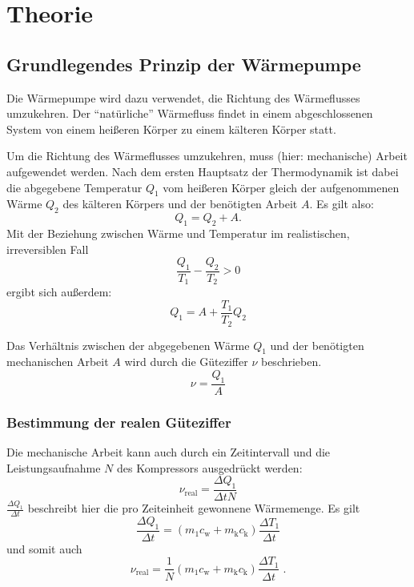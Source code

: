 \section{Theorie} \label{sec:Theorie}

\subsection{Grundlegendes Prinzip der Wärmepumpe}

    Die Wärmepumpe wird dazu verwendet, die Richtung des Wärmeflusses umzukehren.
    Der \enquote{natürliche} Wärmefluss findet in einem abgeschlossenen System von einem heißeren Körper
    zu einem kälteren Körper statt.

    Um die Richtung des Wärmeflusses umzukehren, muss (hier: mechanische) Arbeit aufgewendet werden.
    Nach dem ersten Hauptsatz der Thermodynamik ist dabei die abgegebene Temperatur $Q_1$ vom heißeren Körper
    gleich der aufgenommenen Wärme $Q_2$ des kälteren Körpers und der benötigten Arbeit $A$.
    Es gilt also:
    \begin{equation}
        Q_1 = Q_2 + A .
    \end{equation}
    Mit der Beziehung zwischen Wärme und Temperatur im realistischen, irreversiblen Fall
    \begin{equation}
        \frac{Q_1}{T_1} - \frac{Q_2}{T_2} > 0
    \end{equation}
    ergibt sich außerdem:
    \begin{equation}
        Q_1 = A + \frac{T_1}{T_2} Q_2
    \end{equation}

    Das Verhältnis zwischen der abgegebenen Wärme $Q_1$ und der benötigten mechanischen Arbeit $A$ wird durch die Güteziffer $\nu$
    beschrieben.
    \begin{equation}
        \nu = \frac{Q_1}{A}
    \end{equation}

\subsubsection{Bestimmung der realen Güteziffer}

    Die mechanische Arbeit kann auch durch ein Zeitintervall und die Leistungsaufnahme $N$ des Kompressors ausgedrückt werden:
    \begin{equation}
        \nu_\text{real} = \frac{\Delta Q_1}{\Delta t N}
    \end{equation}
    $\frac{\Delta Q_1}{\Delta t}$ beschreibt hier die pro Zeiteinheit gewonnene Wärmemenge. Es gilt
    \begin{equation}
        \frac{\Delta Q_1}{\Delta t} = (m_1 c_\text{w} + m_\text{k} c_\text{k}) \frac{\Delta T_1}{\Delta t}
    \end{equation}
    und somit auch
    \begin{equation}
      \label{eqn:reale_gueteziffer}
      \nu_\text{real} = \frac{1}{N} (m_1 c_\text{w} + m_\text{k} c_\text{k}) \frac{\Delta T_1}{\Delta t} \; .
    \end{equation}

